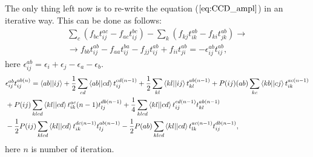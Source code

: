 \documentclass[twoside,english]{uiofysmaster}
\theoremstyle{definition}
\begin{document}
The only thing left now is to re-write the equation ($\ref{eq:CCD_ampl}$) in an iterative way. This can be done as follows:
\begin{align} \label{eq:ccditer}
   \sum_{c}(f_{bc}t_{ij}^{ac}-f_{ac}t_{ij}^{bc} ) - \sum_{k}(f_{kj}t_{ik}^{ab}-f_{ki}t_{jk}^{ab} )\rightarrow \nonumber \\
   \rightarrow f_{bb}t_{ij}^{ab} - f_{aa}t_{ij}^{ba}
  	- f_{jj}t_{ij}^{ab} + f_{ii}t_{ji}^{ab} = - \epsilon_{ij}^{ab} t_{ij}^{ab},
\end{align} 	
 here $ \epsilon_{ij}^{ab} = \epsilon_i + \epsilon_j - \epsilon_a
 - \epsilon_b $.
   \begin{align}
& \epsilon_{ij}^{ab} t_{ij}^{ab(n)} = \braket{ab||ij}  +\frac{1}{2} \sum_{cd}\braket{ab||cd}t_{ij}^{cd(n-1)}
   +	\frac{1}{2} \sum_{kl}\braket{kl||ij}t_{kl}^{ab(n-1)} 
   + P(ij)(ab)  \sum_{kc}\braket{kb||cj}t_{ik}^{ac(n-1)}  \nonumber \\
&  +	P(ij) \sum_{klcd}\braket{kl||cd}t_{ik}^{ac}(n-1) t_{lj}^{db(n-1)}   + 
  	\frac{1}{4} \sum_{klcd}\braket{kl||cd}t_{ij}^{cd(n-1)} t_{kl}^{ab(n-1)}  \\
&  	- \frac{1}{2} P(ij) \sum_{klcd}\braket{kl||cd}t_{ik}^{dc(n-1)}t_{lj}^{ab(n-1)}- \frac{1}{2} P(ab) \sum_{klcd}\braket{kl||cd}t_{lk}^{ac(n-1)}t_{ij}^{db(n-1)}, \nonumber
\end{align}
here $n$ is number of iteration. 
\end{document}

